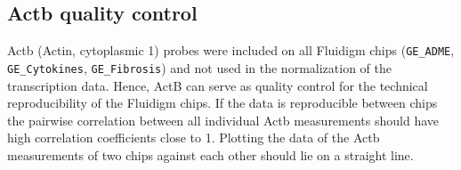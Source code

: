 \documentclass[]{article}
\begin{document}
\subsection{Actb quality control}\label{actb-quality-control}

Actb (Actin, cytoplasmic 1) probes were included on all Fluidigm chips
(\texttt{GE\_ADME}, \texttt{GE\_Cytokines}, \texttt{GE\_Fibrosis}) and
not used in the normalization of the transcription data. Hence, ActB can
serve as quality control for the technical reproducibility of the
Fluidigm chips. If the data is reproducible between chips the pairwise
correlation between all individual Actb measurements should have high
correlation coefficients close to 1. Plotting the data of the Actb
measurements of two chips against each other should lie on a straight
line.
\end{document}

